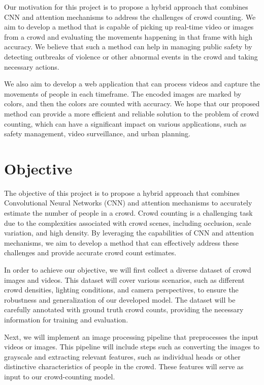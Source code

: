 \documentclass[12pt]{report}
\begin{document}
Our motivation for this project is to propose a hybrid approach that combines CNN and attention mechanisms to address the challenges of crowd counting. We aim to develop a method that is capable of picking up real-time video or images from a crowd and evaluating the movements happening in that frame with high accuracy. We believe that such a method can help in managing public safety by detecting outbreaks of violence or other abnormal events in the crowd and taking necessary actions.
\newline

We also aim to develop a web application that can process videos and capture the movements of people in each timeframe. The encoded images are marked by colors, and then the colors are counted with accuracy. We hope that our proposed method can provide a more efficient and reliable solution to the problem of crowd counting, which can have a significant impact on various applications, such as safety management, video surveillance, and urban planning.
\newline




\section{Objective}

The objective of this project is to propose a hybrid approach that combines Convolutional Neural Networks (CNN) and attention mechanisms to accurately estimate the number of people in a crowd. Crowd counting is a challenging task due to the complexities associated with crowd scenes, including occlusion, scale variation, and high density. By leveraging the capabilities of CNN and attention mechanisms, we aim to develop a method that can effectively address these challenges and provide accurate crowd count estimates.
\newline

In order to achieve our objective, we will first collect a diverse dataset of crowd images and videos. This dataset will cover various scenarios, such as different crowd densities, lighting conditions, and camera perspectives, to ensure the robustness and generalization of our developed model. The dataset will be carefully annotated with ground truth crowd counts, providing the necessary information for training and evaluation.
\newline

Next, we will implement an image processing pipeline that preprocesses the input videos or images. This pipeline will include steps such as converting the images to grayscale and extracting relevant features, such as individual heads or other distinctive characteristics of people in the crowd. These features will serve as input to our crowd-counting model.
\newline
\end{document}
